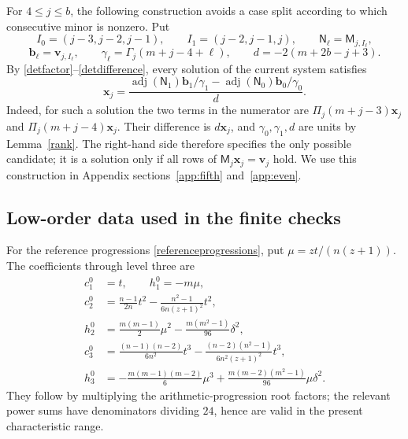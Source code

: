 \documentclass[12pt]{article}
\theoremstyle{remark}
\begin{document}
For $4\le j\le b$, the following construction avoids a case split
according to which consecutive minor is nonzero.  Put
\[
 I_0=(j-3,j-2,j-1),\qquad I_1=(j-2,j-1,j),
 \qquad \mathsf N_\ell=\mathsf M_{j,I_\ell},
\]
\[
 \mathbf b_\ell=\mathbf v_{j,I_\ell},\qquad
 \gamma_\ell=\Gamma_j(m+j-4+\ell),\qquad
 d=-2(m+2b-j+3).
\]
By \eqref{detfactor}--\eqref{detdifference}, every solution of the
current system satisfies
\begin{equation}\label{stable_candidate_formula}
 \mathbf x_j=
 \frac{\operatorname{adj}(\mathsf N_1)\mathbf b_1/\gamma_1
       -\operatorname{adj}(\mathsf N_0)\mathbf b_0/\gamma_0}{d}.
\end{equation}
Indeed, for such a solution the two terms in the numerator are
$\Pi_j(m+j-3)\mathbf x_j$ and $\Pi_j(m+j-4)\mathbf x_j$.
Their difference is $d\mathbf x_j$, and $\gamma_0,\gamma_1,d$ are
units by Lemma~\ref{rank}.  The right-hand side therefore specifies
the only possible candidate; it is a solution only if all rows of
$\mathsf M_j\mathbf x_j=\mathbf v_j$ hold.  We use this construction
in Appendix sections~\ref{app:fifth} and~\ref{app:even}.

\subsection{Low-order data used in the finite checks}\label{app:loworder}

For the reference progressions \eqref{referenceprogressions}, put
$\mu=zt/(n(z+1))$.  The coefficients through level three are
\begin{equation}\label{reference_low_explicit}
\begin{aligned}
 c_1^0&=t,\qquad h_1^0=-m\mu,\\
 c_2^0&=\frac{n-1}{2n}t^2
              -\frac{n^2-1}{6n(z+1)^2}t^2,\\
 h_2^0&=\frac{m(m-1)}2\mu^2-\frac{m(m^2-1)}{96}\delta^2,\\
 c_3^0&=\frac{(n-1)(n-2)}{6n^2}t^3
              -\frac{(n-2)(n^2-1)}{6n^2(z+1)^2}t^3,\\
 h_3^0&=-\frac{m(m-1)(m-2)}6\mu^3
           +\frac{m(m-2)(m^2-1)}{96}\mu\delta^2.
\end{aligned}
\end{equation}
They follow by multiplying the arithmetic-progression root factors; the
relevant power sums have denominators dividing $24$, hence are valid in
the present characteristic range.
\end{document}
